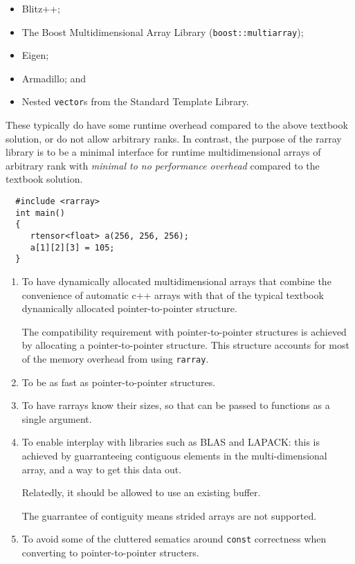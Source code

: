 \documentclass[11pt,twoside]{article}
\begin{document}
\begin{itemize}\itemsep 0pt \parskip 0pt
\item Blitz++;
\item The Boost Multidimensional Array Library (\texttt{boost::multiarray}); 
\item Eigen;
\item Armadillo; and
\item Nested \texttt{vector}s from the Standard Template Library.
\end{itemize}
These typically do have some runtime overhead compared to the above
textbook solution, or do not allow arbitrary ranks. In contrast, the purpose of the rarray
library is to be a minimal interface for runtime multidimensional
arrays of
arbitrary rank with
\emph{minimal to no performance overhead} compared to the textbook solution.

\begin{framed}\vspace{-14pt}%
\begin{verbatim}
  #include <rarray>
  int main() 
  {
     rtensor<float> a(256, 256, 256);
     a[1][2][3] = 105;
  }
\end{verbatim}%
\vspace{-14pt}%
\end{framed}


\begin{enumerate}\itemsep1pt\parskip3pt
 
\item To have dynamically allocated multidimensional arrays that
combine the convenience of automatic c++ arrays with that of the
typical textbook dynamically allocated pointer-to-pointer
structure. 

The compatibility requirement with pointer-to-pointer structures
is achieved by allocating a pointer-to-pointer structure. This
structure accounts for most of the memory overhead from using \texttt{rarray}.

\item To be as fast as pointer-to-pointer structures.

\item To have rarrays know their sizes, so that can be passed to
functions as a single argument. 

\item To enable interplay with libraries such as BLAS and LAPACK: this
  is achieved by guarranteeing contiguous elements in the
  multi-dimensional array, and a way to get this data out.

Relatedly, it should be allowed to use an existing buffer.
    
The guarrantee of contiguity means strided arrays are not supported.

\item To avoid some of the cluttered sematics around \texttt{const} correctness when converting to pointer-to-pointer structers.
\end{enumerate}
\end{document}
